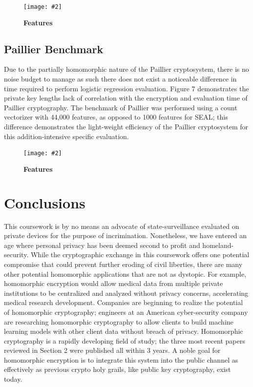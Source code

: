 \documentclass[10pt, a4paper]{article}
\newcommand{\figuremacro}[5]{
    \begin{figure}[#1]
        \centering
        \texttt{[image: \#2]}
        \caption[#3]{\textbf{#3}#4}
        \label{fig:#2}
    \end{figure}
}
\begin{document}
    \figuremacro{h}{features}{Features}{}{1.0}
	
	\subsection{Paillier Benchmark}
	Due to the partially homomorphic nature of the Paillier cryptosystem, there is no noise budget to manage as such there does not exist a noticeable difference in time required to perform logistic regression evaluation. Figure 7 demonstrates the private key lengths lack of correlation with the encryption and evaluation time of Paillier cryptography. The benchmark of Paillier was performed using a count vectorizer with 44,000 features, as opposed to 1000 features for SEAL; this difference demonstrates the light-weight efficiency of the Paillier cryptosystem for this addition-intensive specific evaluation.
	
	 \figuremacro{h}{n_length}{Features}{}{1.0}


	
\section{Conclusions}	
This coursework is by no means an advocate of state-surveillance evaluated on private devices for the purpose of incrimination.  Nonetheless, we have entered an age where personal privacy has been deemed second to profit and homeland-security. While the  cryptographic exchange in this coursework offers one potential compromise that could prevent further eroding of civil liberties, there are many other potential homomorphic applications that are not as dystopic. For example, homomorphic encryption would allow medical data from multiple private institutions to be centralized and analyzed without privacy concerns, accelerating medical research development. Companies are beginning to realize the potential of homomorphic cryptography; engineers at an American cyber-security company are researching homomorphic cryptography to allow clients to build machine learning models with other client data without breach of privacy. Homomorphic cryptography is a rapidly developing field of study; the three most recent papers reviewed in Section 2 were published all within 3 years. A noble goal for homomorphic encryption is to integrate this system into the public channel as effectively as previous crypto holy grails, like public key cryptography, exist today.


\end{document}
